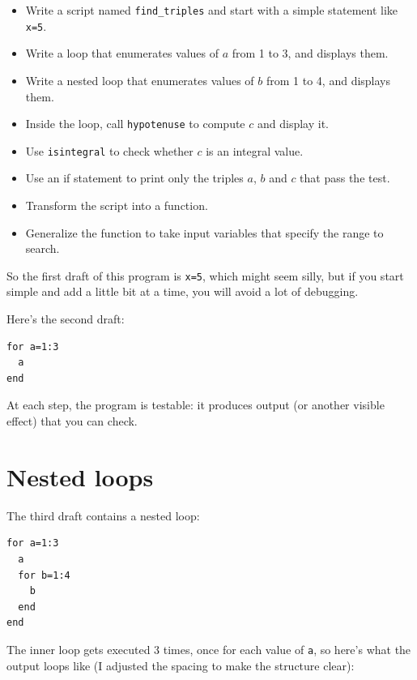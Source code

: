 \documentclass{book}
\begin{document}
\begin{itemize}

\item Write a script named {\tt find\_triples} and start with a simple
statement like {\tt x=5}.

\item Write a loop that enumerates values of $a$ from 1 to 3, and
displays them.

\item Write a nested loop that enumerates values of $b$ from 1 to 4,
and displays them.

\item Inside the loop, call {\tt hypotenuse} to compute $c$ and
display it.

\item Use {\tt isintegral} to check whether $c$ is an integral
value.

\item Use an if statement to print only the triples $a$, $b$ and $c$
that pass the test.

\item Transform the script into a function.

\item Generalize the function to take input variables that
specify the range to search.

\end{itemize}

So the first draft of this program is {\tt x=5}, which might seem
silly, but if you start simple and add a little bit at a time, you
will avoid a lot of debugging.

Here's the second draft:

\begin{verbatim}
for a=1:3
  a
end
\end{verbatim}

At each step, the program is testable: it produces output (or another
visible effect) that you can check.


\section{Nested loops}

The third draft contains a nested loop:

\begin{verbatim}
for a=1:3
  a
  for b=1:4
    b
  end
end
\end{verbatim}

The inner loop gets executed 3 times, once for each value of {\tt a},
so here's what the output loops like (I adjusted the spacing to make
the structure clear):
\end{document}
